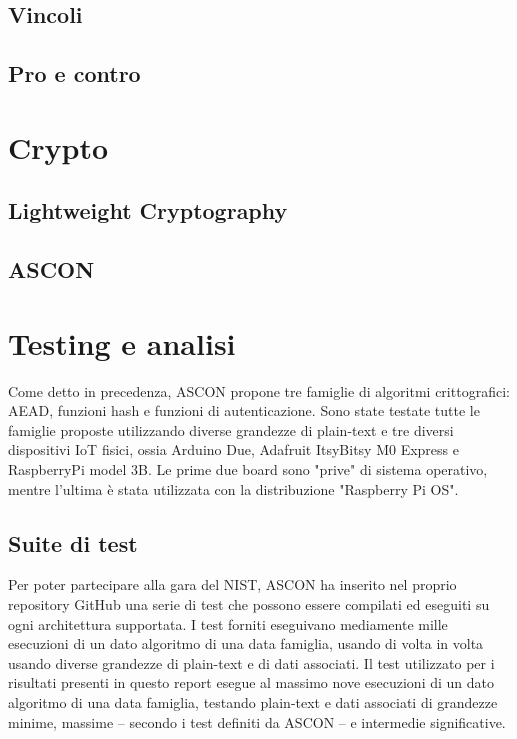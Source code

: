 \documentclass[12pt,a4paper,italian]{report}
\begin{document}
\section{Vincoli}

\section{Pro e contro}

\newpage

\chapter{Crypto}

\section{Lightweight Cryptography}

\section{ASCON}

\newpage

\chapter{Testing e analisi}

Come detto in precedenza, ASCON propone tre famiglie di algoritmi crittografici: AEAD, funzioni hash e funzioni di autenticazione. Sono state testate tutte le famiglie proposte utilizzando diverse grandezze di plain-text e tre diversi dispositivi IoT fisici, ossia Arduino Due, Adafruit ItsyBitsy M0 Express e RaspberryPi model 3B. Le prime due board sono "prive" di sistema operativo, mentre l'ultima è stata utilizzata con la distribuzione "Raspberry Pi OS".

\section{Suite di test}

Per poter partecipare alla gara del NIST, ASCON ha inserito nel proprio repository GitHub una serie di test che possono essere compilati ed eseguiti su ogni architettura supportata. I test forniti eseguivano mediamente mille esecuzioni di un dato algoritmo di una data famiglia, usando di volta in volta usando diverse grandezze di plain-text e di dati associati. Il test utilizzato per i risultati presenti in questo report esegue al massimo nove esecuzioni di un dato algoritmo di una data famiglia, testando plain-text e dati associati di grandezze minime, massime – secondo i test definiti da ASCON – e intermedie significative.
\end{document}
